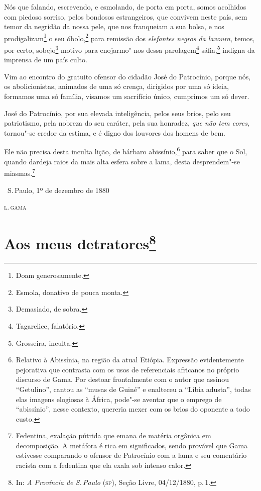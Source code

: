 Nós que falando, escrevendo, e esmolando, de porta em porta, somos
acolhidos com piedoso sorriso, pelos bondosos estrangeiros, que convivem
neste país, sem temor da negridão da nossa pele, que nos franqueiam a
sua bolsa, e nos prodigalizam\footnote{Doam generosamente.} o seu
óbolo,\footnote{Esmola, donativo de pouca monta.} para remissão dos
\emph{elefantes negros da lavoura}, temos, por certo, sobejo\footnote{
  Demasiado, de sobra.} motivo para enojarmo"-nos dessa
parolagem\footnote{Tagarelice, falatório.} sáfia,\footnote{
  Grosseira, inculta.} indigna da imprensa de um país culto.

Vim ao encontro do gratuito ofensor do cidadão José do Patrocínio,
porque nós, os abolicionistas, animados de uma só crença, dirigidos por
uma só ideia, formamos uma só família, visamos um sacrifício único,
cumprimos um só dever.

José do Patrocínio, por sua elevada inteligência, pelos seus brios, pelo
seu patriotismo, pela nobreza do seu caráter, pela sua honradez,
\emph{que não tem cores}, tornou"-se credor da estima, e é digno dos
louvores dos homens de bem.

Ele não precisa desta inculta lição, de bárbaro abissínio,\footnote{
  Relativo à Abissínia, na região da atual Etiópia. Expressão
  evidentemente pejorativa que contrasta com os usos de referenciais
  africanos no próprio discurso de Gama. Por destoar frontalmente com o
  autor que assinou ``Getulino'', cantou as ``musas de Guiné'' e enalteceu a
  ``Líbia adusta'', todas elas imagens elogiosas à África, pode"-se aventar
  que o emprego de ``abissínio'', nesse contexto, quereria mexer com os
  brios do oponente a todo custo.} para saber que o Sol, quando dardeja
raios da mais alta esfera sobre a lama, desta desprendem"-se
miasmas.\footnote{Fedentina, exalação pútrida que emana de matéria
  orgânica em decomposição. A metáfora é rica em significados, sendo
  provável que Gama estivesse comparando o ofensor de Patrocínio com a
  lama e seu comentário racista com a fedentina que ela exala sob
  intenso calor.}

\bigskip

\hfill\ S.\,Paulo, 1º de dezembro de 1880\smallskip

\hfill\textsc{l.\,gama}

\chapter{Aos meus detratores\footnote[*]{In: \emph{A Província de S.\,Paulo} (\textsc{sp}), Seção Livre, 04/12/1880, p.\,1.}}

